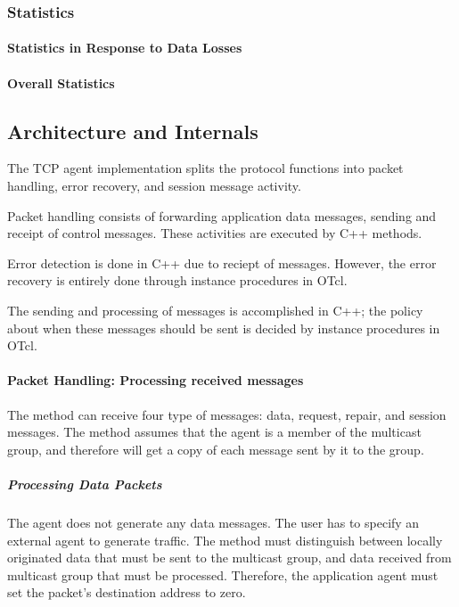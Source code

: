 \documentclass{article}
\begin{document}
\subsubsection{Statistics}

\paragraph{Statistics in Response to Data Losses}
\paragraph{Overall Statistics}

\subsection{Architecture and Internals}
\label{sec:architecture}

The TCP agent implementation splits the protocol functions
into packet handling, error recovery, and session message activity.

Packet handling consists of forwarding application data messages,
sending and receipt of control messages.
These activities are executed by C++ methods.

Error detection is done in C++ due to reciept of messages.
However, the error recovery is entirely done through 
instance procedures in OTcl.

The sending and processing of messages is accomplished in C++;
the policy about when these messages should be sent is decided
by instance procedures in OTcl.

\paragraph{Packet Handling: Processing received messages}
The
method can receive four type of messages:
data, request, repair, and session messages.
The method assumes that
the agent is a member of the multicast group, and 
therefore will get a copy of each message sent by it to the group.

\subparagraph{Processing Data Packets}
The agent does not generate any data messages.
The user has to specify an external agent to generate traffic.
The  method must distinguish between
locally originated data that must be sent to the multicast group,
and data received from multicast group that must be processed.
Therefore, the application agent must
set the packet's destination address to zero.
\end{document}
